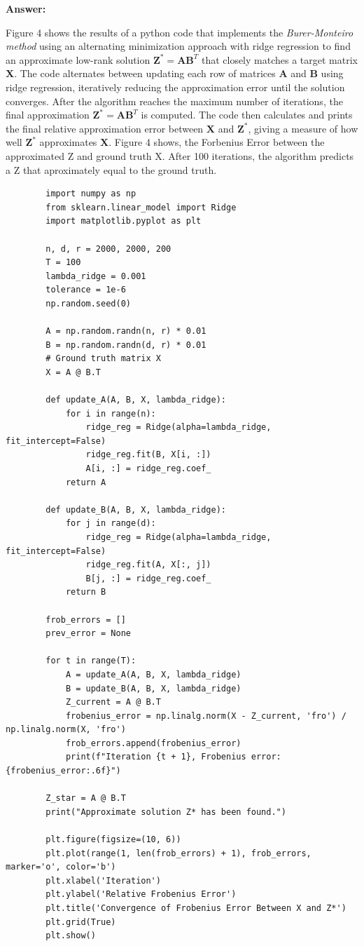 \documentclass[11pt]{article}
\begin{document}
	\textbf{Answer: }

	Figure 4 shows the results of a python code that implements the \textit{Burer-Monteiro method} using an alternating minimization approach with ridge regression to find an approximate low-rank solution \( \mathbf{Z}^* = \mathbf{A} \mathbf{B}^T \) that closely matches a target matrix \( \mathbf{X} \). 
	The code alternates between updating each row of matrices \( \mathbf{A} \) and \( \mathbf{B} \) using ridge regression, iteratively reducing the approximation error until the solution converges.
	After the algorithm reaches the maximum number of iterations, the final approximation \( \mathbf{Z}^* = \mathbf{A} \mathbf{B}^T \) is computed. The code then calculates and prints the final relative approximation error between \( \mathbf{X} \) and \( \mathbf{Z}^* \), giving a measure of how well \( \mathbf{Z}^* \) approximates \( \mathbf{X} \).
	Figure 4 shows, the Forbenius Error between the approximated Z and ground truth X. After 100 iterations, the algorithm predicts a Z that aproximately equal to the ground truth. 


	\begin{verbatim}
		import numpy as np
		from sklearn.linear_model import Ridge
		import matplotlib.pyplot as plt
		
		n, d, r = 2000, 2000, 200  
		T = 100 
		lambda_ridge = 0.001  
		tolerance = 1e-6  
		np.random.seed(0)  
		
		A = np.random.randn(n, r) * 0.01 
		B = np.random.randn(d, r) * 0.01
		# Ground truth matrix X
		X = A @ B.T  
		
		def update_A(A, B, X, lambda_ridge):
			for i in range(n):
				ridge_reg = Ridge(alpha=lambda_ridge, fit_intercept=False)
				ridge_reg.fit(B, X[i, :])  
				A[i, :] = ridge_reg.coef_  
			return A
		
		def update_B(A, B, X, lambda_ridge):
			for j in range(d):
				ridge_reg = Ridge(alpha=lambda_ridge, fit_intercept=False)
				ridge_reg.fit(A, X[:, j])  
				B[j, :] = ridge_reg.coef_  
			return B
		
		frob_errors = []
		prev_error = None  
		
		for t in range(T):
			A = update_A(A, B, X, lambda_ridge)
			B = update_B(A, B, X, lambda_ridge)
			Z_current = A @ B.T
			frobenius_error = np.linalg.norm(X - Z_current, 'fro') / np.linalg.norm(X, 'fro')
			frob_errors.append(frobenius_error)
			print(f"Iteration {t + 1}, Frobenius error: {frobenius_error:.6f}")
			
		Z_star = A @ B.T
		print("Approximate solution Z* has been found.")
		
		plt.figure(figsize=(10, 6))
		plt.plot(range(1, len(frob_errors) + 1), frob_errors, marker='o', color='b')
		plt.xlabel('Iteration')
		plt.ylabel('Relative Frobenius Error')
		plt.title('Convergence of Frobenius Error Between X and Z*')
		plt.grid(True)
		plt.show()
		
	\end{verbatim}
\end{document}
